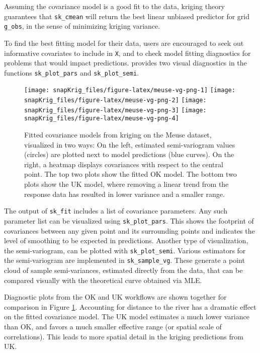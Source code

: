 Assuming the covariance model is a good fit to the data, kriging theory guarantees that \texttt{sk\_cmean} will return the best linear unbiased predictor for grid \texttt{g\_obs}, in the sense of minimizing kriging variance.

To find the best fitting model for their data, users are encouraged to seek out informative covariates to include in \texttt{X}, and to check model fitting diagnostics for problems that would impact predictions.  provides two visual diagnostics in the functions \texttt{sk\_plot\_pars} and \texttt{sk\_plot\_semi}.

\begin{figure}[!htb]
\texttt{[image: snapKrig\_files/figure-latex/meuse-vg-png-1]} \texttt{[image: snapKrig\_files/figure-latex/meuse-vg-png-2]} \texttt{[image: snapKrig\_files/figure-latex/meuse-vg-png-3]} \texttt{[image: snapKrig\_files/figure-latex/meuse-vg-png-4]} \caption{Fitted covariance models from kriging on the Meuse dataset, visualized in two ways: On the left, estimated semi-variogram values (circles) are plotted next to model predictions (blue curves). On the right, a heatmap displays covariances with respect to the central point. The top two plots show the fitted OK model. The bottom two plots show the UK model, where removing a linear trend from the response data has resulted in lower variance and a smaller range.}\label{fig:meuse-vg-png}
\end{figure}

The output of \texttt{sk\_fit} includes a list of covariance parameters. Any such parameter list can be visualized using \texttt{sk\_plot\_pars}. This shows the footprint of covariances between any given point and its surrounding points and indicates the level of smoothing to be expected in predictions. Another type of visualization, the semi-variogram, can be plotted with \texttt{sk\_plot\_semi}. Various estimators for the semi-variogram are implemented in \texttt{sk\_sample\_vg}. These generate a point cloud of sample semi-variances, estimated directly from the data, that can be compared visually with the theoretical curve obtained via MLE.

Diagnostic plots from the OK and UK workflows are shown together for comparison in Figure \ref{fig:meuse-vg-png}. Accounting for distance to the river has a dramatic effect on the fitted covariance model. The UK model estimates a much lower variance than OK, and favors a much smaller effective range (or spatial scale of correlations). This leads to more spatial detail in the kriging predictions from UK.

